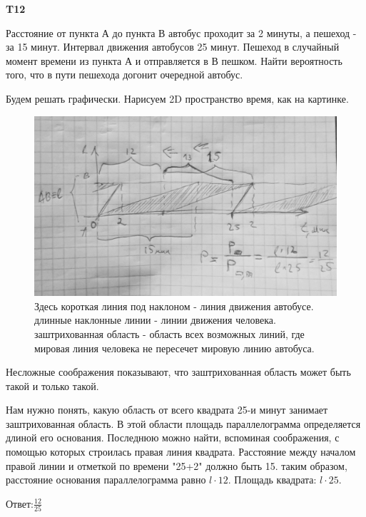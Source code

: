 \documentclass[a4paper,12pt]{article} %
\begin{document}
\begin{example}\textbf{T12}

Расстояние от пункта А до пункта В автобус проходит за 2 минуты, а пешеход - за 15 минут. 
Интервал движения автобусов 25 минут. 
Пешеход в случайный момент времени из пункта А и отправляется в В пешком. 
Найти вероятность того, что в пути пешехода догонит очередной автобус.

Будем решать графически.
Нарисуем 2D пространство время, как на картинке.


\begin{figure}[h!]
	\centering
	\includegraphics[width=0.5\linewidth]{t12}
	\caption{Здесь короткая линия под наклоном - линия движения автобусе. длинные наклонные линии - линии движения человека. заштрихованная область - область всех возможных линий, где мировая линия человека не пересечет мировую линию автобуса.}
	\label{fig:t12}
\end{figure}

Несложные соображения показывают, что заштрихованная область может быть такой и только такой.

Нам нужно понять, какую область от всего квадрата 25-и минут занимает заштрихованная область.
В этой области площадь параллелограмма определяется длиной его основания. 
Последнюю можно найти, вспоминая соображения, с помощью которых строилась правая линия квадрата. 
Расстояние между началом правой линии и отметкой по времени "25+2" должно быть 15. таким образом, расстояние основания параллелограмма равно $ l\cdot 12$. Площадь квадрата:  $ l\cdot 25$.

Ответ:$ \frac{12}{25} $

\end{example}
\end{document}
